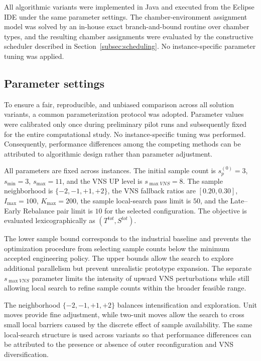 \documentclass[11pt]{article}
\begin{document}
All algorithmic variants were implemented in Java and executed from the Eclipse IDE under the same parameter settings. The chamber-environment assignment model was solved by an in-house exact branch-and-bound routine over chamber types, and the resulting chamber assignments were evaluated by the constructive scheduler described in Section~\ref{subsec:scheduling}. No instance-specific parameter tuning was applied.

\subsection{Parameter settings}
\label{subsec:parameter_settings}

To ensure a fair, reproducible, and unbiased comparison across all solution variants, a common parameterization protocol was adopted. Parameter values were calibrated only once during preliminary pilot runs and subsequently fixed for the entire computational study. No instance-specific tuning was performed. Consequently, performance differences among the competing methods can be attributed to algorithmic design rather than parameter adjustment.

All parameters are fixed across instances. The initial sample count is \(s_p^{(0)}=3\), \(s_{\min}=3\), \(s_{\max}=11\), and the VNS \textsc{UP} level is \(s_{\max VNS}=8\). The sample neighborhood is \(\{-2,-1,+1,+2\}\), the VNS fallback ratios are \([0.20,0.30]\), \(I_{\max}=100\), \(K_{\max}=200\), the sample local-search pass limit is \(50\), and the Late--Early Rebalance pair limit is \(10\) for the selected configuration. The objective is evaluated lexicographically as \((T^{tot},S^{tot})\).

The lower sample bound corresponds to the industrial baseline and prevents the optimization procedure from selecting sample counts below the minimum accepted engineering policy. The upper bounds allow the search to explore additional parallelism but prevent unrealistic prototype expansion. The separate \(s_{\max VNS}\) parameter limits the intensity of upward VNS perturbations while still allowing local search to refine sample counts within the broader feasible range.

The neighborhood \(\{-2,-1,+1,+2\}\) balances intensification and exploration. Unit moves provide fine adjustment, while two-unit moves allow the search to cross small local barriers caused by the discrete effect of sample availability. The same local-search structure is used across variants so that performance differences can be attributed to the presence or absence of outer reconfiguration and VNS diversification.
\end{document}

